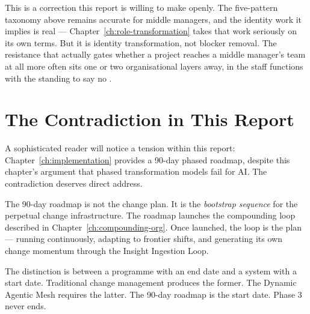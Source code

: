 This is a correction this report is willing to make openly. The five-pattern taxonomy above remains accurate for middle managers, and the identity work it implies is real --- Chapter~\ref{ch:role-transformation} takes that work seriously on its own terms. But it is identity transformation, not blocker removal. The resistance that actually gates whether a project reaches a middle manager's team at all more often sits one or two organisational layers away, in the staff functions with the standing to say no \parencite{Pereira2026Playbook}.

\section{The Contradiction in This Report}

A sophisticated reader will notice a tension within this report: Chapter~\ref{ch:implementation} provides a 90-day phased roadmap, despite this chapter's argument that phased transformation models fail for AI. The contradiction deserves direct address.

The 90-day roadmap is not the change plan. It is the \emph{bootstrap sequence} for the perpetual change infrastructure. The roadmap launches the compounding loop described in Chapter~\ref{ch:compounding-org}. Once launched, the loop is the plan --- running continuously, adapting to frontier shifts, and generating its own change momentum through the Insight Ingestion Loop.

The distinction is between a programme with an end date and a system with a start date. Traditional change management produces the former. The Dynamic Agentic Mesh requires the latter. The 90-day roadmap is the start date. Phase 3 never ends.
